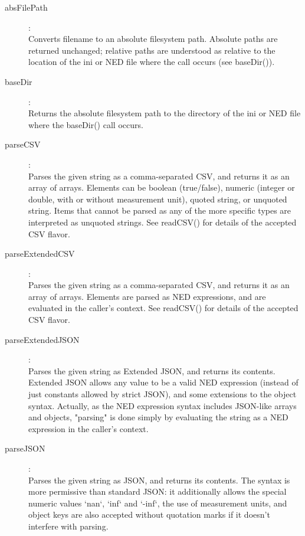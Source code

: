 \begin{description}
\item[absFilePath]:  \\
    Converts filename to an absolute filesystem path. Absolute paths are
    returned unchanged; relative paths are understood as relative to the
    location of the ini or NED file where the call occurs (see baseDir()).

\item[baseDir]:  \\
    Returns the absolute filesystem path to the directory of the ini or NED
    file where the baseDir() call occurs.

\item[parseCSV]:  \\
    Parses the given string as a comma-separated CSV, and returns it as an
    array of arrays. Elements can be boolean (true/false), numeric (integer or
    double, with or without measurement unit), quoted string, or unquoted
    string. Items that cannot be parsed as any of the more specific types are
    interpreted as unquoted strings. See readCSV() for details of the
    accepted CSV flavor.

\item[parseExtendedCSV]:  \\
    Parses the given string as a comma-separated CSV, and returns it as an
    array of arrays. Elements are parsed as NED expressions, and are evaluated
    in the caller's context. See readCSV() for details of the accepted CSV
    flavor.

\item[parseExtendedJSON]:  \\
    Parses the given string as Extended JSON, and returns its contents.
    Extended JSON allows any value to be a valid NED expression (instead of
    just constants allowed by strict JSON), and some extensions to the object
    syntax. Actually, as the NED expression syntax includes JSON-like arrays
    and objects, "parsing" is done simply by evaluating the string as a NED
    expression in the caller's context.

\item[parseJSON]:  \\
    Parses the given string as JSON, and returns its contents. The syntax is
    more permissive than standard JSON: it additionally allows the special
    numeric values `nan`, `inf` and `-inf`, the use of measurement units, and
    object keys are also accepted without quotation marks if it doesn't
    interfere with parsing.


\end{description}
